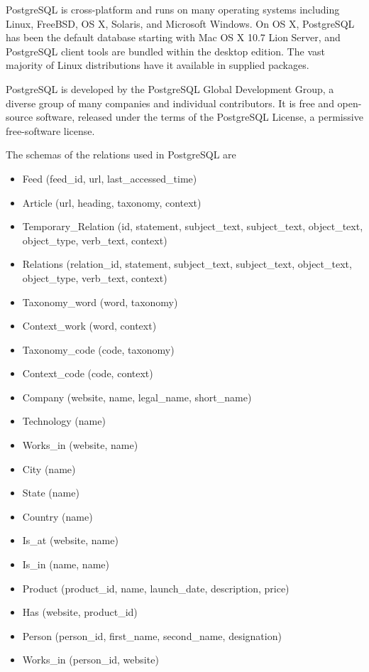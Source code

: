 \par
PostgreSQL is cross-platform and runs on many operating systems including Linux, FreeBSD, OS X, Solaris, and Microsoft Windows. On OS X, PostgreSQL has been the default database starting with Mac OS X 10.7 Lion Server, and PostgreSQL client tools are bundled within the desktop edition. The vast majority of Linux distributions have it available in supplied packages.
\par PostgreSQL is developed by the PostgreSQL Global Development Group, a diverse group of many companies and individual contributors. It is free and open-source software, released under the terms of the PostgreSQL License, a permissive free-software license.
\par The schemas of the relations used in PostgreSQL are
\begin{itemize}
\item Feed (feed\_id, url, last\_accessed\_time)
\item Article (url, heading, taxonomy, context)
\item Temporary\_Relation (id, statement, subject\_text, subject\_text, object\_text, object\_type, verb\_text, context) 
\item Relations (relation\_id, statement, subject\_text, subject\_text, object\_text, object\_type, verb\_text, context) 
\item Taxonomy\_word (word, taxonomy)
\item Context\_work (word, context)
\item Taxonomy\_code (code, taxonomy)
\item Context\_code (code, context)
\item Company (website, name, legal\_name, short\_name)
\item Technology (name)
\item Works\_in (website, name)
\item City (name)
\item State (name)
\item Country (name)
\item Is\_at (website, name)
\item Is\_in (name, name)
\item Product (product\_id, name, launch\_date, description, price)
\item Has (website, product\_id)
\item Person (person\_id, first\_name, second\_name, designation)
\item Works\_in (person\_id, website)
\end{itemize}

